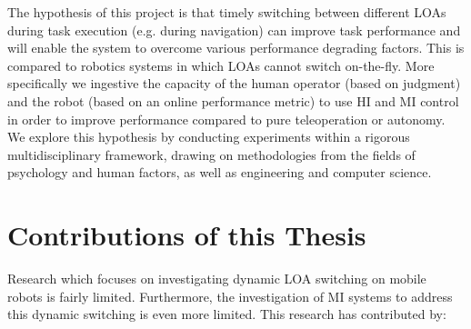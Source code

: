 \documentclass[a4paper,12pt,oneside,openright]{bhamthesis}
\begin{document}
The hypothesis of this project is that timely switching between different LOAs during task execution (e.g. during navigation) can improve task performance and will enable the system to overcome various performance degrading factors. This is compared to robotics systems in which LOAs cannot switch on-the-fly. More specifically we ingestive the capacity of the human operator (based on judgment) and the robot (based on an online performance metric) to use HI and MI control in order to improve performance compared to pure teleoperation or autonomy. We explore this hypothesis by conducting experiments within a rigorous multidisciplinary framework, drawing on methodologies from the fields of psychology and human factors, as well as engineering and computer science. 

\section{Contributions of this Thesis}
Research which focuses on investigating dynamic LOA switching on mobile robots is fairly limited. Furthermore, the investigation of MI systems to address this dynamic switching is even more limited. This research has contributed by:
\end{document}

